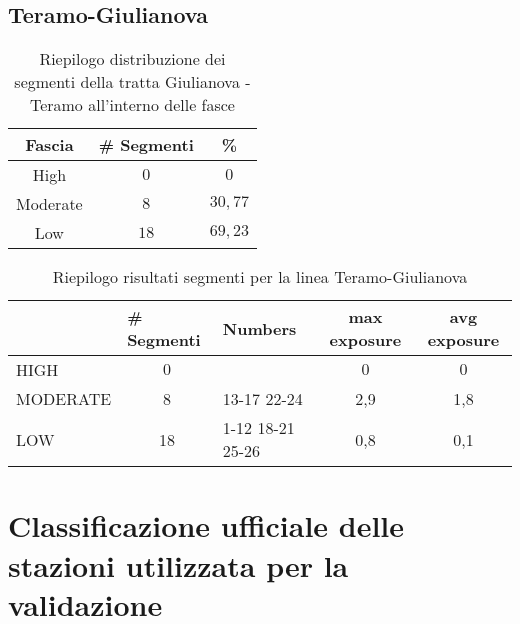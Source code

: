 \newpage
\subsection{Teramo-Giulianova}
\label{app:giulianovateramo}
\begin{table}[h]
\centering
\begin{tabular}{|c|c|c|}
\hline \rowcolor{lightgray}
Fascia   & \# Segmenti & \%    \\ \hline \rowcolor{flamingopink}
High     & $0$           & $0$     \\ \hline \rowcolor{icterine}
Moderate & $8$          & $30,77$ \\ \hline \rowcolor{inchworm}
Low      & $18$          & $69,23$ \\ \hline
\end{tabular}
\caption{Riepilogo distribuzione dei segmenti della tratta Giulianova - Teramo all’interno delle fasce}
\end{table} 
\begin{table}[hpt]
	\centering
	\begin{tabular}{|l|c|l|c|c|}
		\hline \rowcolor{lightgray}
		& \multicolumn{1}{l|}{\# Segmenti} & Numbers          & max exposure & avg exposure \\ 
		\hline \rowcolor{flamingopink}
		HIGH     & $0$                                       &                  &      $0$        &       $0$       \\ 
		\hline \rowcolor{icterine}
		MODERATE & 8                                       & 13-17 22-24      & 2,9 & 1,8  \\ 
		\hline \rowcolor{inchworm}
		LOW      & 18                                      & 1-12 18-21 25-26 & 0,8 & 0,1 \\ 
		\hline
	\end{tabular}
	\caption{Riepilogo risultati segmenti per la linea Teramo-Giulianova}
\end{table}
\newpage

\section{Classificazione ufficiale delle stazioni utilizzata per la validazione }
\label{risultatiUfficiali}



